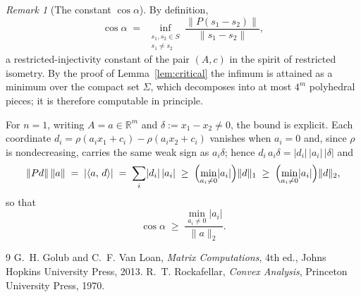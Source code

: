 \documentclass[11pt]{article}
\numberwithin{equation}{section}
\theoremstyle{remark}
\newtheorem{remark}[theorem]{Remark}
\newcommand{\R}{\mathbb{R}}
\newcommand{\norm}[1]{\lVert #1\rVert}
\newcommand{\ip}[2]{\langle #1,\,#2\rangle}
\begin{document}
\begin{remark}[The constant $\cos\alpha$]\label{rem:constant}
By definition,
\[
\cos\alpha\;=\;\inf_{\substack{s_1,s_2\in S\\ s_1\ne s_2}}\frac{\norm{P(s_1-s_2)}}{\norm{s_1-s_2}} ,
\]
a restricted-injectivity constant of the pair $(A,c)$ in the spirit of restricted isometry. By the proof of Lemma~\ref{lem:critical} the infimum is attained as a minimum over the compact set $\Sigma$, which decomposes into at most $4^m$ polyhedral pieces; it is therefore computable in principle.

For $n=1$, writing $A=a\in\R^m$ and $\delta:=x_1-x_2\ne 0$, the bound is explicit. Each coordinate $d_i=\rho(a_ix_1+c_i)-\rho(a_ix_2+c_i)$ vanishes when $a_i=0$ and, since $\rho$ is nondecreasing, carries the same weak sign as $a_i\delta$; hence $d_i\,a_i\delta=\lvert d_i\rvert\,\lvert a_i\rvert\,\lvert\delta\rvert$ and
\[
\norm{Pd}\,\norm{a}\;=\;\lvert\ip{a}{d}\rvert\;=\;\sum_i \lvert d_i\rvert\,\lvert a_i\rvert\;\ge\;\Bigl(\min_{a_i\ne 0}\lvert a_i\rvert\Bigr)\norm{d}_1\;\ge\;\Bigl(\min_{a_i\ne 0}\lvert a_i\rvert\Bigr)\norm{d}_2 ,
\]
so that
\[
\cos\alpha\;\ge\;\frac{\min_{a_i\ne 0}\lvert a_i\rvert}{\norm{a}_2}.
\]
\end{remark}

\begin{thebibliography}{9}
 G.~H. Golub and C.~F. Van Loan, \emph{Matrix Computations}, 4th ed., Johns Hopkins University Press, 2013.
 R.~T. Rockafellar, \emph{Convex Analysis}, Princeton University Press, 1970.
\end{thebibliography}
\end{document}
